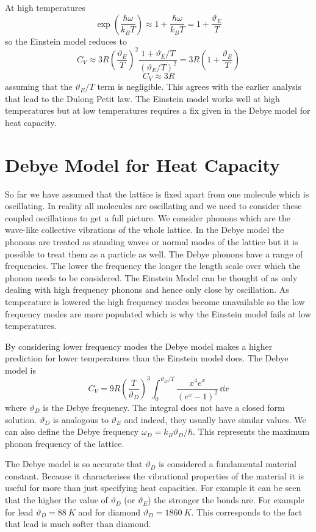     At high temperatures
    \[\exp\left(\frac{\hbar\omega}{k_BT}\right) \approx 1 + \frac{\hbar\omega}{k_BT} = 1 + \frac{\vartheta_E}{T}\]
    so the Einstein model reduces to
    \[C_V \approx 3R\left(\frac{\vartheta_E}{T}\right)^2\frac{1 + \vartheta_E/T}{(\vartheta_E/T)^2} = 3R\left(1 + \frac{\vartheta_E}{T}\right)\]
    \[C_V \approx 3R\]
    assuming that the \(\vartheta_E/T\) term is negligible.
    This agrees with the earlier analysis that lead to the Dulong Petit law.
    The Einstein model works well at high temperatures but at low temperatures requires a fix given in the Debye model for heat capacity.
    
    \section{Debye Model for Heat Capacity}
    So far we have assumed that the lattice is fixed apart from one molecule which is oscillating.
    In reality all molecules are oscillating and we need to consider these coupled oscillations to get a full picture.
    We consider phonons which are the wave-like collective vibrations of the whole lattice.
    In the Debye model the phonons are treated as standing waves or normal modes of the lattice but it is possible to treat them as a particle as well.
    The Debye phonons have a range of frequencies.
    The lower the frequency the longer the length scale over which the phonon needs to be considered.
    The Einstein Model can be thought of as only dealing with high frequency phonons and hence only close by oscillation.
    As temperature is lowered the high frequency modes become unavailable so the low frequency modes are more populated which is why the Einstein model fails at low temperatures.
    
    By considering lower frequency modes the Debye model makes a higher prediction for lower temperatures than the Einstein model does.
    The Debye model is
    \[C_V = 9R\left(\frac{T}{\vartheta_D}\right)^3 \int_0^{\vartheta_D/T}\frac{x^4e^x}{(e^x - 1)^2}\,\dd x\]
    where \(\vartheta_D\) is the Debye frequency.
    The integral does not have a closed form solution.
    \(\vartheta_D\) is analogous to \(\vartheta_E\) and indeed, they usually have similar values.
    We can also define the Debye frequency \(\omega_D = k_B\vartheta_D/\hbar\).
    This represents the maximum phonon frequency of the lattice.
    
    The Debye model is so accurate that \(\vartheta_D\) is considered a fundamental material constant.
    Because it characterises the vibrational properties of the material it is useful for more than just specifying heat capacities.
    For example it can be seen that the higher the value of \(\vartheta_D\) (or \(\vartheta_E\)) the stronger the bonds are.
    For example for lead \(\vartheta_D = \SI{88}{K}\) and for diamond \(\vartheta_D = \SI{1860}{K}\).
    This corresponds to the fact that lead is much softer than diamond.
    
